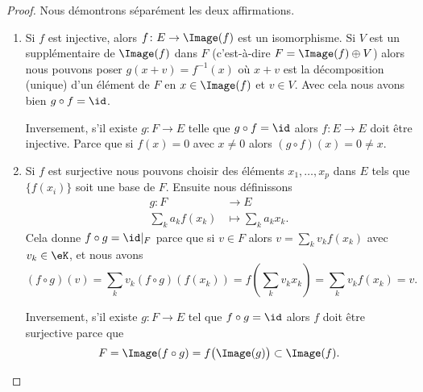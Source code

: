 \begin{proof}
    Nous démontrons séparément les deux affirmations.
    \begin{enumerate}
        \item
            Si \( f\) est injective, alors \( f\colon E\to \Image(f)\) est un isomorphisme. Si $V$ est un supplémentaire de \( \Image(f)\) dans \( F\) (c'est-à-dire \( F=\Image(f)\oplus V\)) alors nous pouvons poser \( g(x+v)=f^{-1}(x)\) où \( x+v\) est la décomposition (unique) d'un élément de \( F\) en \( x\in\Image(f)\) et \( v\in V\). Avec cela nous avons bien \( g\circ f=\id\).

            Inversement, s'il existe \( g\colon F\to E\) telle que \( g\circ f=\id\) alors \( f\colon E\to E\) doit être injective. Parce que si \( f(x)=0\) avec \( x\neq 0\) alors \( (g\circ f)(x)=0\neq x\).
        \item
            Si \( f\) est surjective nous pouvons choisir des éléments \( x_1,\ldots, x_p\) dans \( E\) tels que \( \{ f(x_i) \}\) soit une base de \( F\). Ensuite nous définissons
            \begin{equation}
                \begin{aligned}
                    g\colon F&\to E \\
                    \sum_k a_k f(x_k)&\mapsto \sum_k a_k x_k.
                \end{aligned}
            \end{equation}
            Cela donne \(  f\circ g=\id|_F\) parce que si \( v\in F\) alors \( v=\sum_kv_kf(x_k)\) avec \( v_k\in \eK\), et nous avons
            \begin{equation}
                (f\circ g)(v)=\sum_k v_k (f\circ g) \left(f(x_k)\right)
                             =f\left( \sum_k v_k x_k \right)
                             =\sum_k v_k f(x_k) = v.
            \end{equation}

            Inversement, s'il existe \( g\colon F\to E\) tel que \( f\circ g=\id\) alors \( f\) doit être surjective parce que
            \begin{equation}
                F=\Image(f\circ g)=f\big( \Image(g) \big)\subset \Image(f).
            \end{equation}
    \end{enumerate}
\end{proof}



